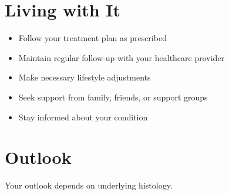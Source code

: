 \section{Living with It}
\begin{itemize}[noitemsep]
  \item Follow your treatment plan as prescribed
  \item Maintain regular follow-up with your healthcare provider
  \item Make necessary lifestyle adjustments
  \item Seek support from family, friends, or support groups
  \item Stay informed about your condition
\end{itemize}
\section{Outlook}
Your outlook depends on underlying histology.
